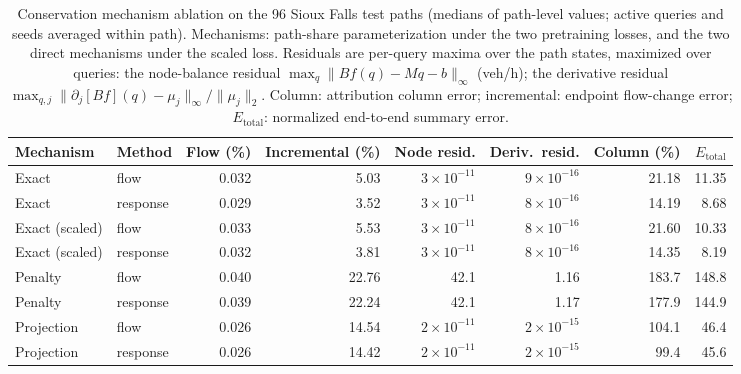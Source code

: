 \begin{table}[pos=htbp]\centering\footnotesize
\caption{Conservation mechanism ablation on the 96 Sioux Falls test
paths (medians of path-level values; active queries and seeds averaged
within path). Mechanisms: path-share parameterization under the two
pretraining losses, and the two direct mechanisms under the scaled
loss. Residuals are per-query maxima over the path states, maximized
over queries: the node-balance residual $\max_q\|Bf(q)-Mq-b\|_\infty$
(veh/h); the derivative residual
$\max_{q,j}\|\partial_j[Bf](q)-\mu_j\|_\infty/\|\mu_j\|_2$. Column:
attribution column error; incremental: endpoint flow-change error;
$E_{\mathrm{total}}$: normalized end-to-end summary error.}\label{tab:conservation}
\setlength{\tabcolsep}{3.6pt}
\begin{tabular*}{\tblwidth}{@{\extracolsep{\fill}}llrrrrrr}
\toprule
Mechanism & Method & Flow (\%) & Incremental (\%) & Node resid. & Deriv.\ resid. & Column (\%) & $E_{\mathrm{total}}$\\
\midrule
Exact & flow & 0.032 & 5.03 & $3\times10^{-11}$ & $9\times10^{-16}$ & 21.18 & 11.35\\
Exact & response & 0.029 & 3.52 & $3\times10^{-11}$ & $8\times10^{-16}$ & 14.19 & 8.68\\
\addlinespace
Exact (scaled) & flow & 0.033 & 5.53 & $3\times10^{-11}$ & $8\times10^{-16}$ & 21.60 & 10.33\\
Exact (scaled) & response & 0.032 & 3.81 & $3\times10^{-11}$ & $8\times10^{-16}$ & 14.35 & 8.19\\
\addlinespace
Penalty & flow & 0.040 & 22.76 & 42.1 & 1.16 & 183.7 & 148.8\\
Penalty & response & 0.039 & 22.24 & 42.1 & 1.17 & 177.9 & 144.9\\
\addlinespace
Projection & flow & 0.026 & 14.54 & $2\times10^{-11}$ & $2\times10^{-15}$ & 104.1 & 46.4\\
Projection & response & 0.026 & 14.42 & $2\times10^{-11}$ & $2\times10^{-15}$ & 99.4 & 45.6\\
\bottomrule\end{tabular*}\end{table}


